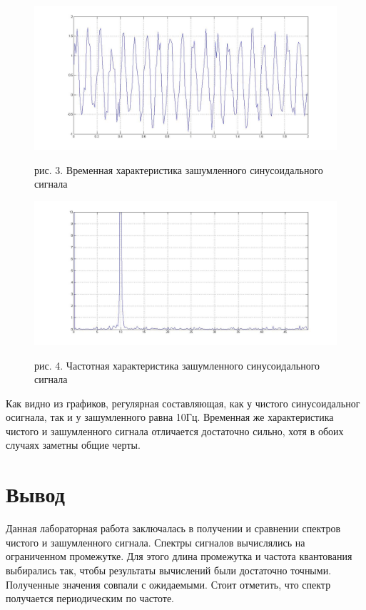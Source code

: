 \documentclass[10pt,a4paper]{report}
\begin{document}
\begin{figure}
\begin{center}
\includegraphics[width=150mm, scale = 0.3]{nsint.jpg}
\end{center}
рис. 3. Временная характеристика зашумленного синусоидального сигнала
\begin{center}
\includegraphics[width=150mm, scale = 0.3]{nsinch.jpg}
\end{center}
рис. 4. Частотная характеристика зашумленного синусоидального сигнала
\end{figure}
Как видно из графиков, регулярная составляющая, как у чистого синусоидальног осигнала, так и у зашумленного равна 10Гц. Временная же характеристика чистого и зашумленного сигнала отличается достаточно сильно, хотя в обоих случаях заметны общие черты.
\section{Вывод}
Данная лабораторная работа заключалась в получении и сравнении спектров чистого и зашумленного сигнала. Спектры сигналов вычислялись на ограниченном промежутке. Для этого длина промежутка и частота квантования выбирались так, чтобы результаты вычислений были достаточно точными. Полученные значения совпали с ожидаемыми. Стоит отметить, что спектр получается периодическим по частоте.
\end{document}

